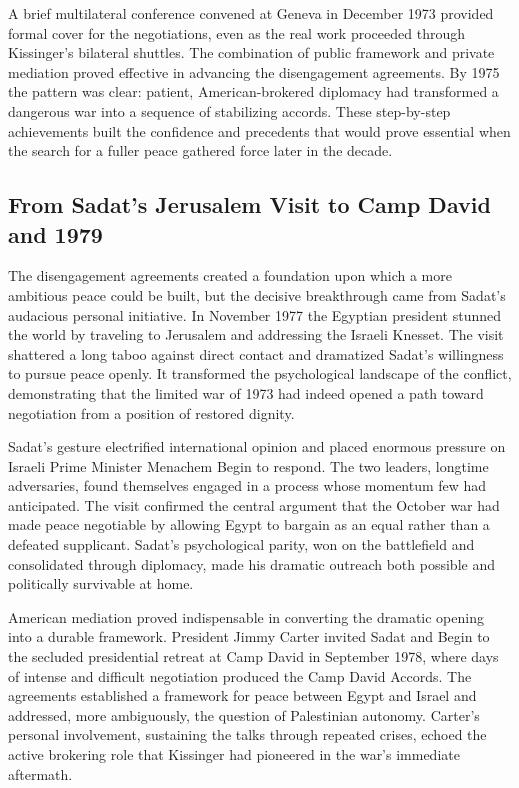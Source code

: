 A brief multilateral conference convened at Geneva in December 1973 provided formal cover for the negotiations, even as the real work proceeded through Kissinger's bilateral shuttles. The combination of public framework and private mediation proved effective in advancing the disengagement agreements. By 1975 the pattern was clear: patient, American-brokered diplomacy had transformed a dangerous war into a sequence of stabilizing accords. These step-by-step achievements built the confidence and precedents that would prove essential when the search for a fuller peace gathered force later in the decade. \cite{kissinger1982} \cite{siniver2013} \cite{rabinovich2004}

\subsection{From Sadat's Jerusalem Visit to Camp David and 1979}
The disengagement agreements created a foundation upon which a more ambitious peace could be built, but the decisive breakthrough came from Sadat's audacious personal initiative. In November 1977 the Egyptian president stunned the world by traveling to Jerusalem and addressing the Israeli Knesset. The visit shattered a long taboo against direct contact and dramatized Sadat's willingness to pursue peace openly. It transformed the psychological landscape of the conflict, demonstrating that the limited war of 1973 had indeed opened a path toward negotiation from a position of restored dignity.

Sadat's gesture electrified international opinion and placed enormous pressure on Israeli Prime Minister Menachem Begin to respond. The two leaders, longtime adversaries, found themselves engaged in a process whose momentum few had anticipated. The visit confirmed the central argument that the October war had made peace negotiable by allowing Egypt to bargain as an equal rather than a defeated supplicant. Sadat's psychological parity, won on the battlefield and consolidated through diplomacy, made his dramatic outreach both possible and politically survivable at home.

American mediation proved indispensable in converting the dramatic opening into a durable framework. President Jimmy Carter invited Sadat and Begin to the secluded presidential retreat at Camp David in September 1978, where days of intense and difficult negotiation produced the Camp David Accords. The agreements established a framework for peace between Egypt and Israel and addressed, more ambiguously, the question of Palestinian autonomy. Carter's personal involvement, sustaining the talks through repeated crises, echoed the active brokering role that Kissinger had pioneered in the war's immediate aftermath.

